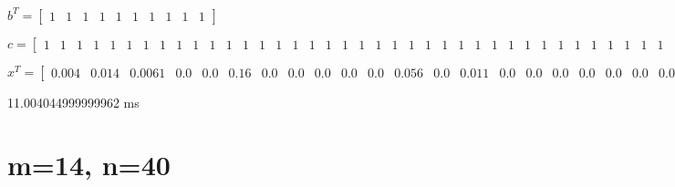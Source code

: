 \documentclass[8pt]{article}
\begin{document}
\footnotesize
$ b^T =
\begin{bmatrix}
  1  &  1  &  1  &  1  &  1  &  1  &  1  &  1  &  1  &  1 
\end{bmatrix}
$


\footnotesize
$ c =
\begin{bmatrix}
  1  &  1  &  1  &  1  &  1  &  1  &  1  &  1  &  1  &  1  &  1  &  1  &  1  &  1  &  1  &  1  &  1  &  1  &  1  &  1  &  1  &  1  &  1  &  1  &  1  &  1  &  1  &  1  &  1  &  1  &  1  &  1  &  1  &  1  &  1  &  1  &  1  &  1  &  1  &  1 
\end{bmatrix}
$


\footnotesize
$ x^T =
\begin{bmatrix}
  0.004 &  0.014 &  0.0061 &  0.0 &  0.0 &  0.16 &  0.0 &  0.0 &  0.0 &  0.0 &  0.0 &  0.056 &  0.0 &  0.011 &  0.0 &  0.0 &  0.0 &  0.0 &  0.0 &  0.0 &  0.0 &  0.2 &  0.0 &  0.0 &  0.0 &  0.0 &  0.0 &  0.0 &  0.11 &  0.0 &  0.0 &  0.0 &  0.0 &  0.0 &  0.0 &  0.11 &  0.048 &  0.0 &  0.0 &  0.0
\end{bmatrix}
$


11.004044999999962  ms


\section{ m=14, n=40 }
\end{document}
